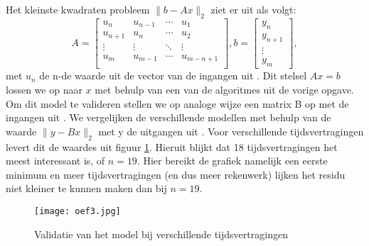 Het kleinste kwadraten probleem $ \lVert b-Ax \rVert_2$ ziet er uit als volgt:
$$A = \begin{bmatrix} 
u_n 		&u_{n-1} 	&\cdots	&u_1\\
u_{n+1}	&u_n		&\cdots	&u_2 \\
\vdots	&\vdots	&\ddots	&\vdots \\
u_m 		&u_{m-1}	&\cdots	&u_{m-n+1} \\
\end{bmatrix}  ,b = \begin{bmatrix} 
y_n\\
y_{n+1}\\
\vdots\\
y_m
\end{bmatrix},$$
met $u_n$ de n-de waarde uit de vector van de ingangen uit .
Dit stelsel $Ax=b$ lossen we op naar $x$ met behulp van een van de algoritmes uit de vorige opgave. Om dit model te valideren stellen we op analoge wijze een matrix B op met de ingangen uit . We vergelijken de verschillende modellen met behulp van de waarde $ \lVert y-Bx \rVert_2$ met y de uitgangen uit . Voor verschillende tijdsvertragingen levert dit de waardes uit figuur \ref{fig:oef3}. Hieruit blijkt dat 18 tijdsvertragingen het meest interessant is, of $n=19$. Hier bereikt de grafiek namelijk een eerste minimum en meer tijdsvertragingen (en dus meer rekenwerk) lijken het residu niet kleiner te kunnen maken dan bij $n=19$.
\begin{figure}[H]
    \centering
    \texttt{[image: oef3.jpg]}
    \caption{Validatie van het model bij verschillende tijdsvertragingen}
    \label{fig:oef3}
\end{figure}